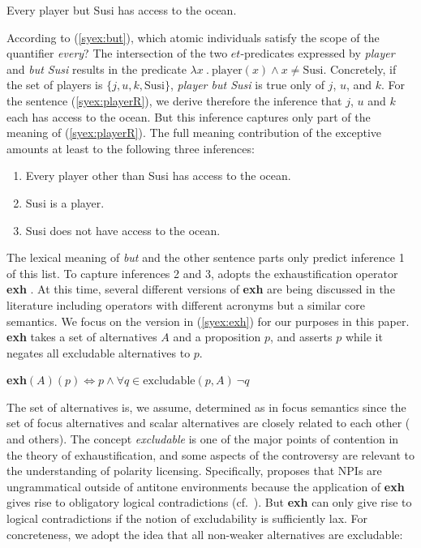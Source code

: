 \documentclass[output=paper]{langscibook}
\begin{document}
\ea \label{syex:playerR} 
   Every player but Susi has access to the ocean.\z

According to (\ref{syex:but}), which atomic individuals satisfy the scope of the quantifier \emph{every}?
The intersection of the two $et$-predicates expressed by \emph{player} and \emph{but Susi} results in the predicate $\lambda x\ .\ \text{player}(x) \wedge x \neq \text{Susi}$.
Concretely, if the set of players is $\{j, u, k, \text{Susi}\}$, \emph{player but Susi} is true only of $j$, $u$, and $k$.  
For the sentence (\ref{syex:playerR}), we derive therefore the inference that $j$, $u$ and $k$ each has access to the ocean.
But this inference captures only part of the meaning of (\ref{syex:playerR}).
The full meaning contribution of the exceptive amounts at least to the following three inferences:

\ea%
    \begin{enumerate}
    \item Every player other than Susi has access to the ocean.
    \item Susi is a player.
    \item Susi does not have access to the ocean.
    \end{enumerate}\label{syex:inferences}
\z

The lexical meaning of \emph{but} and the other sentence parts only predict inference 1 of this list.
To capture inferences 2 and 3, \citet{hirsch16b} adopts the exhaustification operator \textbf{exh} \citep{chierchia13a,fox07b}.
At this time, several different versions of \textbf{exh} are being discussed in the literature including operators with different acronyms but a similar core semantics.
We focus on the version in (\ref{syex:exh}) for our purposes in this paper.
\textbf{exh} takes a set of alternatives $A$ and a proposition $p$, and asserts $p$ while it negates all excludable alternatives to $p$.

\ea \label{syex:exh}
\textbf{exh}$(A)(p) \Leftrightarrow p \land \forall q \in \text{excludable}(p,A) \ \neg q$\z

The set of alternatives is, we assume, determined as in focus semantics since the set of focus alternatives and scalar alternatives are closely related to each other (\citealt{gotzner19a} and others).
The concept \emph{excludable} is one of the major points of contention in the theory of exhaustification, and some aspects of the controversy are relevant to the understanding of polarity licensing.
Specifically, \citet{chierchia13a} proposes that NPIs are ungrammatical outside of antitone environments because the application of \textbf{exh} gives rise to obligatory logical contradictions (cf.\ \citealt{crnic14a}).
But \textbf{exh} can only give rise to logical contradictions if the notion of excludability is sufficiently lax.
For concreteness, we adopt the idea that all non-weaker alternatives are excludable:
\end{document}
